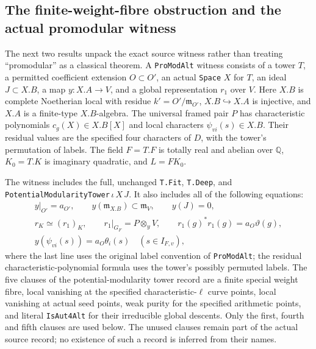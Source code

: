 \subsection{The finite-weight-fibre obstruction and the actual promodular witness}

The next two results unpack the exact source witness rather
than treating ``promodular'' as a classical theorem.  A
\texttt{ProModAlt} witness consists of a tower $T$, a
permitted coefficient extension $O\subset O'$, an actual
\texttt{Space} $X$ for $T$, an ideal $J\subset X.B$, a map
$y:X.A\to V$, and a global representation $r_1$ over $V$.
Here $X.B$ is complete Noetherian local with residue
$k'=O'/\mathfrak m_{O'}$, $X.B\hookrightarrow X.A$ is
injective, and $X.A$ is a finite-type $X.B$-algebra.
The universal framed pair $P$ has characteristic
polynomials $c_g(X)\in X.B[X]$ and local characters
$\psi_{vi}(s)\in X.B$.  Their residual values are the
specified four characters of $D$, with the tower's
permutation of labels.  The field $F=T.F$ is totally
real and abelian over $\mathbb Q$, $K_0=T.K$ is imaginary
quadratic, and $L=FK_0$.

The witness includes the full, unchanged
\texttt{T.Fit}, \texttt{T.Deep}, and
\texttt{PotentialModularityTower}$\,\iota\,X\,J$.
It also includes all of the following equations:
\[
 \begin{gathered}
 y|_{O'}=a_{O'},\qquad
 y(\mathfrak m_{X.B})\subset\mathfrak m_V,\qquad y(J)=0,\\
 r_K\simeq (r_1)_K,\qquad
 r_1|_{G_F}=P\otimes_yV,\qquad
 r_1(g)^*r_1(g)=a_O\vartheta(g),\\
 y(\psi_{vi}(s))=a_O\theta_i(s)
       \quad(s\in I_{F,v}),
 \end{gathered}
 \tag{IX.26}
\]
where the last line uses the original label convention of
\texttt{ProModAlt}; the residual characteristic-polynomial
formula uses the tower's possibly permuted labels.
The five clauses of the potential-modularity tower record are
a finite special weight fibre, local vanishing at the
specified characteristic-$\ell$ curve points, local
vanishing at actual seed points, weak purity for the
specified arithmetic points, and literal
\texttt{IsAut4Alt} for their irreducible global descents.
Only the first, fourth and fifth clauses are used below.
The unused clauses remain part of the actual source
record; no existence of such a record is inferred from
their names.

